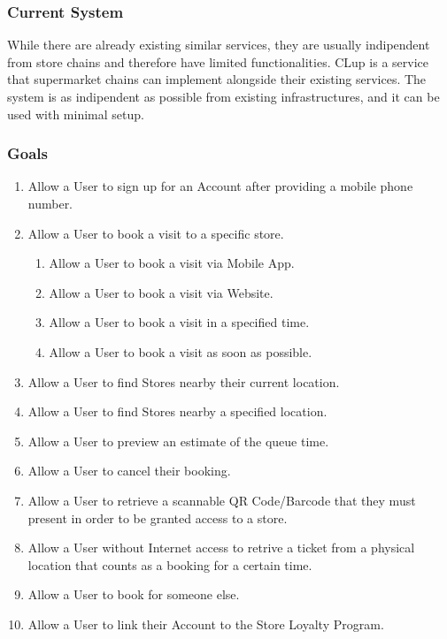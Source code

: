 \subsubsection{Current System}
While there are already existing similar services, they are usually indipendent from store chains and
therefore have limited functionalities. CLup is a service that supermarket chains can implement alongside
their existing services. The system is as indipendent as possible from existing infrastructures, and
it can be used with minimal setup.

\subsubsection{Goals}
\begin{enumerate}
    \item Allow a User to sign up for an Account after providing a mobile phone number.
    \item Allow a User to book a visit to a specific store.
        \begin{enumerate}
            \item Allow a User to book a visit via Mobile App.
            \item Allow a User to book a visit via Website.
            \item Allow a User to book a visit in a specified time.
            \item Allow a User to book a visit as soon as possible.
        \end{enumerate}
    \item Allow a User to find Stores nearby their current location.
    \item Allow a User to find Stores nearby a specified location.
    \item Allow a User to preview an estimate of the queue time.
    \item Allow a User to cancel their booking.
    \item Allow a User to retrieve a scannable QR Code/Barcode that they must present in order to be granted access to a store.
    \item Allow a User without Internet access to retrive a ticket from a physical location that counts as a booking for a certain time.
    \item Allow a User to book for someone else.
    \item Allow a User to link their Account to the Store Loyalty Program.
        \begin{enumerate}

\end{enumerate}
\end{enumerate}
